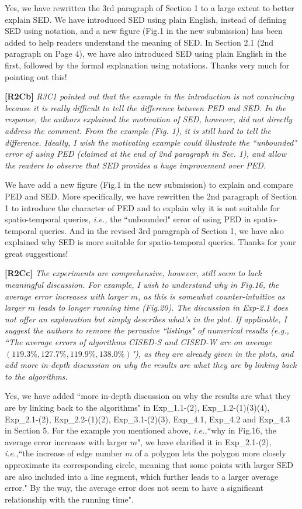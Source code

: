 \documentclass{letter}
\newcommand{\ie}{\emph{i.e.,}\xspace}
\begin{document}
Yes, we have rewritten the 3rd paragraph of Section 1 to a large extent to better explain SED. We have introduced SED using plain English, instead of defining SED using notation, and a new figure (Fig.1 in the new submission) has been added to help readers understand the meaning of SED.
{In Section 2.1 (2nd paragraph on Page 4), we have also introduced SED using plain English in the first, followed by the formal explanation using notations.}
Thanks very much for pointing out this!


\textbf{[R2Cb]} \emph{{R3C1} pointed out that the example in the introduction is not convincing because it is really difficult to tell the difference between PED and SED. In the response, the authors explained the motivation of SED, however, did not directly address the comment. From the example (Fig. 1), it is still hard to tell the difference. Ideally, I wish the motivating example could illustrate the ``unbounded" error of using PED (claimed at the end of 2nd paragraph in Sec. 1), and allow the readers to observe that SED provides a huge improvement over PED.}

We have add a new figure (Fig.1 in the new submission) to explain and compare PED and SED. More specifically, we have rewritten the 2nd paragraph of Section 1 to introduce the character of PED and to explain why it is not suitable for spatio-temporal queries, \ie the ``unbounded" error of using PED in spatio-temporal queries. And in the revised 3rd paragraph of Section 1, we have also explained why SED is more suitable for spatio-temporal queries.
Thanks for your great suggestions!

\textbf{[R2Cc]} \emph{The experiments are comprehensive, however, still seem to lack meaningful discussion. For example, I wish to understand why in Fig.16, the average error increases with larger $m$, as this is somewhat counter-intuitive as larger $m$ leads to longer running time (Fig.20). The discussion in Exp-2.1 does not offer an explanation but simply describes what's in the plot. If applicable, I suggest the authors to remove the pervasive ``listings" of numerical results (e.g., ``The average errors of algorithms CISED-S and CISED-W are on average $(119.3\%, 127.7\%, 119.9\%, 138.0\%)$"), as they are already given in the plots, and add more in-depth discussion on why the results are what they are by linking back to the algorithms. }

Yes, we have added ``more in-depth discussion on why the results are what they are by linking back to the algorithms" in Exp\_1.1-(2), Exp\_1.2-(1)(3)(4), Exp\_2.1-(2), Exp\_2.2-(1)(2), Exp\_3.1-(2)(3), Exp\_4.1, Exp\_4.2 and Exp\_4.3 in Section 5.
For the example you mentioned above,  \ie ``why in Fig.16, the average error increases with larger $m$", we have clarified it in Exp\_2.1-(2), \ie ``the increase of edge number $m$ of a polygon lets the polygon more closely approximate its corresponding circle, meaning that some points with larger SED are also included into a line segment, which further leads to a larger average error." {By the way, the average error does not seem to have a significant relationship with the running time".}
\end{document}
